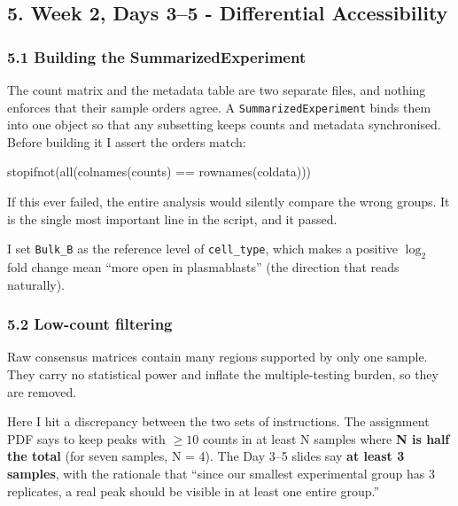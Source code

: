 \documentclass[
  11pt,
  a4paper,
]{article}
\newenvironment{Shaded}{}{}
\newcommand{\FunctionTok}[1]{\textcolor[rgb]{0.02,0.16,0.49}{#1}}
\newcommand{\NormalTok}[1]{#1}
\newcommand{\SpecialCharTok}[1]{\textcolor[rgb]{0.25,0.44,0.63}{#1}}
\begin{document}
\hypertarget{week-2-days-35---differential-accessibility}{%
\subsection{5. Week 2, Days 3--5 - Differential
Accessibility}\label{week-2-days-35---differential-accessibility}}

\hypertarget{building-the-summarizedexperiment}{%
\subsubsection{5.1 Building the
SummarizedExperiment}\label{building-the-summarizedexperiment}}

The count matrix and the metadata table are two separate files, and
nothing enforces that their sample orders agree. A
\texttt{SummarizedExperiment} binds them into one object so that any
subsetting keeps counts and metadata synchronised. Before building it I
assert the orders match:

\begin{Shaded}
\begin{Highlighting}[]
\FunctionTok{stopifnot}\NormalTok{(}\FunctionTok{all}\NormalTok{(}\FunctionTok{colnames}\NormalTok{(counts) }\SpecialCharTok{==} \FunctionTok{rownames}\NormalTok{(coldata)))}
\end{Highlighting}
\end{Shaded}

If this ever failed, the entire analysis would silently compare the
wrong groups. It is the single most important line in the script, and it
passed.

I set \texttt{Bulk\_B} as the reference level of \texttt{cell\_type},
which makes a positive \(\log_2\) fold change mean ``more open in
plasmablasts'' (the direction that reads naturally).

\hypertarget{low-count-filtering}{%
\subsubsection{5.2 Low-count filtering}\label{low-count-filtering}}

Raw consensus matrices contain many regions supported by only one
sample. They carry no statistical power and inflate the multiple-testing
burden, so they are removed.

Here I hit a discrepancy between the two sets of instructions. The
assignment PDF says to keep peaks with \(\geq 10\) counts in at least N
samples where \textbf{N is half the total} (for seven samples, N = 4).
The Day 3--5 slides say \textbf{at least 3 samples}, with the rationale
that ``since our smallest experimental group has 3 replicates, a real
peak should be visible in at least one entire group.''
\end{document}

